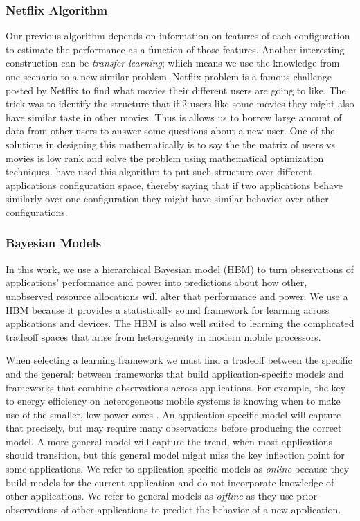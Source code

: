 \subsubsection{Netflix Algorithm}
Our previous algorithm depends on information on features of each 
configuration to estimate the performance as a function of those features. 
Another interesting construction can be \textit{transfer learning}; which means 
we use the knowledge from one scenario to a new similar problem. 
Netflix problem is a famous challenge posted by Netflix to find what movies 
their different users are going to like. The trick was to identify 
the structure that if 2 users like some movies they might also have 
similar taste in other movies. Thus is allows us to borrow large amount of data from
other users to answer some questions about a new user.
One of the 
solutions in designing this mathematically is to say the the matrix of 
users vs movies is low rank and solve the problem using mathematical optimization techniques.\cite{delimitrou2013paragon} have used this algorithm to put 
such structure over different applications configuration space, thereby 
saying that if two applications behave similarly over one configuration they might have similar behavior over other configurations. 


\subsubsection{Bayesian Models}

In this work, we use a hierarchical Bayesian model (HBM) to turn
observations of applications' performance and power into predictions
about how other, unobserved resource allocations will alter that
performance and power.  We use a HBM because it provides a
statistically sound framework for learning across applications and
devices.  The HBM is also well suited to learning the complicated
tradeoff spaces that arise from heterogeneity in modern mobile
processors.

When selecting a learning framework we must find a tradeoff between
the specific and the general; \ie between frameworks that build
application-specific models and frameworks that combine observations
across applications.  For example, the key to energy efficiency on
heterogeneous mobile systems is knowing when to make use of the
smaller, low-power cores \cite{}.  An application-specific model will
capture that precisely, but may require many observations before
producing the correct model.  A more general model will capture the
trend, \eg when most applications should transition, but this general
model might miss the key inflection point for some applications.  We
refer to application-specific models as \emph{online} because they
build models for the current application and do not incorporate
knowledge of other applications.  We refer to general models as
\emph{offline} as they use prior observations of other applications to
predict the behavior of a new application.  

